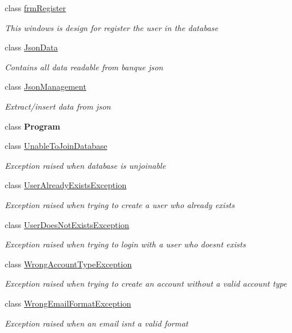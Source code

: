 \begin{DoxyCompactItemize}
class \mbox{\hyperlink{class_projet_banque_1_1frm_register}{frm\+Register}}
\begin{DoxyCompactList}\small\item\em This windows is design for register the user in the database \end{DoxyCompactList}\item 
class \mbox{\hyperlink{class_projet_banque_1_1_json_data}{Json\+Data}}
\begin{DoxyCompactList}\small\item\em Contains all data readable from banque json \end{DoxyCompactList}\item 
class \mbox{\hyperlink{class_projet_banque_1_1_json_management}{Json\+Management}}
\begin{DoxyCompactList}\small\item\em Extract/insert data from json \end{DoxyCompactList}\item 
class {\bfseries Program}
\item 
class \mbox{\hyperlink{class_projet_banque_1_1_unable_to_join_database}{Unable\+To\+Join\+Database}}
\begin{DoxyCompactList}\small\item\em Exception raised when database is unjoinable \end{DoxyCompactList}\item 
class \mbox{\hyperlink{class_projet_banque_1_1_user_already_exists_exception}{User\+Already\+Exists\+Exception}}
\begin{DoxyCompactList}\small\item\em Exception raised when trying to create a user who already exists \end{DoxyCompactList}\item 
class \mbox{\hyperlink{class_projet_banque_1_1_user_does_not_exists_exception}{User\+Does\+Not\+Exists\+Exception}}
\begin{DoxyCompactList}\small\item\em Exception raised when trying to login with a user who doesn\textquotesingle{}t exists \end{DoxyCompactList}\item 
class \mbox{\hyperlink{class_projet_banque_1_1_wrong_account_type_exception}{Wrong\+Account\+Type\+Exception}}
\begin{DoxyCompactList}\small\item\em Exception raised when trying to create an account without a valid account type \end{DoxyCompactList}\item 
class \mbox{\hyperlink{class_projet_banque_1_1_wrong_email_format_exception}{Wrong\+Email\+Format\+Exception}}
\begin{DoxyCompactList}\small\item\em Exception raised when an email isn\textquotesingle{}t a valid format \end{DoxyCompactList}\end{DoxyCompactItemize}
